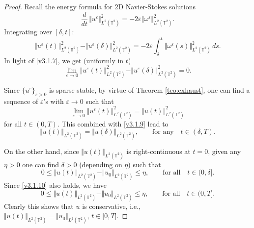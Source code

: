 \documentclass[11pt, a4paper,leqno]{amsart}
\theoremstyle{plain}
\numberwithin{equation}{section}
\theoremstyle{definition}
\theoremstyle{remark}
\def\T{\mathbb{T}}
\begin{document}
\begin{proof}
Recall the energy formula for $2$D Navier-Stokes solutions
\[
\frac{d}{dt}\,\Vert u^{\varepsilon}\Vert_{L^{2}(\T^2)}^{2}=-2\varepsilon\Vert\omega^{\varepsilon}%
\Vert_{L^{2}(\T^2)}^{2}.
\]
Integrating over $[\delta,t]$:
\[
\Vert u^{\varepsilon}(t)\Vert_{L^{2}(\T^2)}^{2}-\Vert u^{\varepsilon}(\delta)\Vert_{L^{2}(\T^2)}^{2}%
=-2\varepsilon\int_{\delta}^{t}\Vert\omega^{\varepsilon}(s)\Vert_{L^{2}(\T^2)}^{2}\,ds.
\]
In light of \eqref{v3.1.7}, we get (uniformly in $t$)
\begin{equation}
\lim_{\varepsilon\rightarrow0}\Vert u^{\varepsilon}(t)\Vert_{L^{2}(\T^2)}^{2}-\Vert u^{\varepsilon}%
(\delta)\Vert_{L^{2}(\T^2)}^{2}=0. \label{v3.1.9}%
\end{equation}


Since $\{u^\varepsilon\}_{\varepsilon > 0}$ is sparse stable, by virtue of Theorem \ref{teo:exhaust}, one can find a sequence of $\varepsilon$'s with
$\varepsilon\rightarrow0$ such that
\[
\lim_{\varepsilon\rightarrow0}\Vert u^{\varepsilon}(t)\Vert_{L^{2}(\T^2)}^{2}=\Vert u(t)\Vert
_{L^{2}(\T^2)}^{2}%
\]
for all $t\in(0,T)$. This combined with \eqref{v3.1.9} lead to
\begin{equation}
\Vert u(t)\Vert_{L^{2}(\T^2)}=\Vert u(\delta)\Vert_{L^{2}(\T^2)},\qquad\text{for any}\quad
t\in(\delta,T). \label{v3.1.10}%
\end{equation}


On the other hand, since $\Vert u(t)\Vert_{L^{2}(\T^2)}$ is right-continuous at
$t=0$, given any $\eta>0$ one can find $\delta>0$ (depending on $\eta$) such that
\[
0\leq\Vert u(t)\Vert_{L^{2}(\T^2)}-\Vert u_{0}\Vert_{L^{2}(\T^2)}\leq\eta
,\qquad\text{for all}\quad t\in(0,\delta].
\]
Since \eqref{v3.1.10} also holds, we have
\[
0\leq\Vert u(t)\Vert_{L^{2}(\T^2)}-\Vert u_{0}\Vert_{L^{2}(\T^2)}\leq\eta
,\qquad\text{for all}\quad t\in(0,T].
\]
Clearly this shows that $u$ is conservative, i.e., $\Vert u(t)\Vert_{L^{2}(\T^2)
}=\Vert u_{0}\Vert_{L^{2}(\T^2)}, \, t\in\lbrack0,T]$.
\end{proof}
\end{document}
